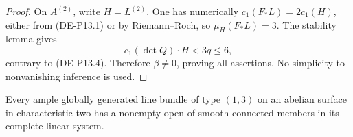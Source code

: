 \begin{proof}
On \(A^{(2)}\), write \(H=L^{(2)}\). One has numerically
\(c_1(F_*L)=2c_1(H)\), either from (DE-P13.1) or by
Riemann--Roch, so \(\mu_H(F_*L)=3\).
The stability lemma gives
\[
                     c_1(\det Q)\cdot H<3q\le6,
\]
contrary to (DE-P13.4). Therefore \(\beta\ne0\), proving all
assertions. No simplicity-to-nonvanishing inference is used.
\end{proof}

\begin{lemma}
\label{lem:DE-primitive-one-three-smooth-member}
Every ample globally generated line bundle of type \((1,3)\)
on an abelian surface in characteristic two has a nonempty open
of smooth connected members in its complete linear system.
\end{lemma}
